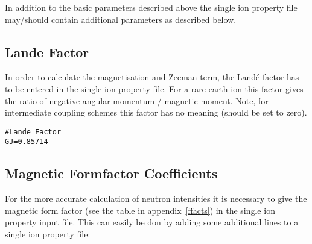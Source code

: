 In addition to the basic parameters described above the single ion property file 
may/should contain additional parameters as described below. 

\subsection{Lande Factor}

In order to calculate the magnetisation and Zeeman term, the Land\'e factor
has to be entered in the single ion property file. For a rare earth ion this
factor gives the ratio of negative angular momentum / magnetic moment.
Note, for intermediate coupling schemes this factor has no meaning (should be set to zero).

\begin{verbatim}
#Lande Factor
GJ=0.85714
\end{verbatim}


\subsection{Magnetic Formfactor Coefficients}

For the more accurate calculation of neutron intensities it is
necessary to give the magnetic form factor (see the table in appendix~\ref{ffacts})
in the single ion property input file. This can
easily be don by adding some additional lines to a single ion property file:

